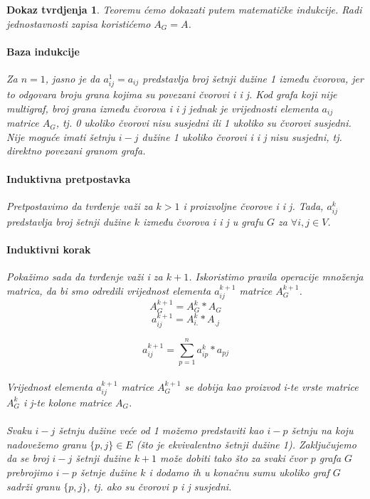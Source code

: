 \documentclass[11pt]{article}
\newtheorem*{custom_proof}{Dokaz tvrdjenja}
\begin{document}
		\begin{custom_proof}
		    Teoremu ćemo dokazati putem matematičke indukcije. Radi jednostavnosti zapisa koristićemo $A_G = A$.
			
			\paragraph{Baza indukcije}
			Za $n=1$, jasno je da $a_{ij}^1 = a_{ij}$ predstavlja broj šetnji dužine 1 između čvorova, jer to odgovara broju grana kojima su povezani čvorovi i i j. 
			Kod grafa koji nije multigraf, broj grana između čvorova i i j jednak je vrijednosti elementa $a_{ij}$ matrice $A_G$, tj. 0 ukoliko čvorovi nisu susjedni ili 1 ukoliko su čvorovi susjedni. 
			Nije moguće imati šetnju $i-j$ dužine 1 ukoliko čvorovi i i j nisu susjedni, tj. direktno povezani granom grafa. 
			
			\paragraph{Induktivna pretpostavka}
			Pretpostavimo da tvrđenje važi za $k>1$ i proizvoljne čvorove i i j. Tada, $a_{ij}^k$ predstavlja broj šetnji dužine $k$ između čvorova i i j u grafu $G$ za $\forall i,j \in V$. 
			
			\paragraph{Induktivni korak}
			Pokažimo sada da tvrđenje važi i za $k+1$.
			Iskoristimo pravila operacije množenja matrica, da bi smo odredili vrijednost elementa $a_{ij}^{k+1}$ matrice $A_G^{k+1}$.  
			\[
				A_G^{k+1} = A_G^k * A_G
			\]
			\[
				a_{ij}^{k+1} = A_{i.}^k * A_{.j} 
			\]

			\begin{equation}
			a_{ij}^{k+1} = \sum_{p=1}^{n} a_{ip}^k * a_{pj}
			\label{eq:element}
			\end{equation}
		
			\paragraph{}
			Vrijednost elementa $a_{ij}^{k+1}$ matrice $A_G^{k+1}$ se dobija kao proizvod i-te vrste matrice $A_G^k$ i j-te kolone matrice $A_G$. 
			
			\paragraph{}
			Svaku $i-j$ šetnju dužine veće od 1 možemo predstaviti kao $i-p$ šetnju na koju nadovežemo granu $\{p,j\} \in E$ (što je ekvivalentno šetnji dužine 1). 
			Zaključujemo da se broj $i-j$ šetnji dužine $k+1$ može dobiti tako što za svaki čvor $p$ grafa $G$ prebrojimo $i-p$ šetnje dužine $k$ i dodamo ih u konačnu sumu ukoliko graf $G$ sadrži granu $\{p,j\}$,
			tj. ako su čvorovi p i j susjedni.
		

\end{custom_proof}
\end{document}
